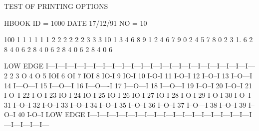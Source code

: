 \begin{Listing}
 TEST OF PRINTING OPTIONS                                                        
 
 HBOOK     ID =      1000                                        DATE  17/12/91              NO =  10
 
     100                               1   1   1   1   1   1   2   2   2   2   2   2   3   3   3
      10       1   3   4   6   8   9   1   2   4   6   7   9   0   2   4   5   7   8   0   2   3
       1.      6   2   8   4   0   6   2   8   4   0   6   2   8   4   0   6   2   8   4   0   6
 
  LOW EDGE I---I---I---I---I---I---I---I---I---I---I---I---I---I---I---I---I---I---I---I---I---I---
     2
     2
     3      O
     4      O
     5      IOI
     6       OI
     7        IOI
     8           IO-I
     9               IO-I
    10                      I-O-I
    11                                I-O--I
    12                                                  I--O--I
    13                                                              I--O---I
    14                                                                        I---O---I
    15                                                                                   I---O---I
    16                                                                             I---O----I
    17                                                                         I---O---I
    18                                                          I---O---I
    19                                                 I--O--I
    20                                       I--O--I
    21                                  I-O--I
    22                        I-O-I
    23                IO-I
    24              IO-I
    25                IO-I
    26                IO-I
    27               IO-I
    28                     I-O-I
    29                           I-O-I
    30                               I-O--I
    31                                  I--O--I
    32                               I-O--I
    33                                        I--O--I
    34                                       I--O--I
    35                                     I--O--I
    36                                        I--O--I
    37                                       I--O---I
    38                                       I--O--I
    39                                     I--O--I
    40                               I-O--I
  LOW EDGE I---I---I---I---I---I---I---I---I---I---I---I---I---I---I---I---I---I---I---I---I---I---
 

\end{Listing}

